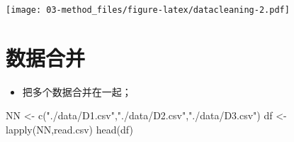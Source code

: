\documentclass[
]{book}
\newenvironment{Shaded}{\begin{snugshade}}{\end{snugshade}}
\newcommand{\FunctionTok}[1]{\textcolor[rgb]{0.00,0.00,0.00}{#1}}
\newcommand{\NormalTok}[1]{#1}
\newcommand{\OtherTok}[1]{\textcolor[rgb]{0.56,0.35,0.01}{#1}}
\newcommand{\StringTok}[1]{\textcolor[rgb]{0.31,0.60,0.02}{#1}}
\providecommand{\tightlist}{%
  \setlength{\itemsep}{0pt}\setlength{\parskip}{0pt}}
\begin{document}
\texttt{[image: 03-method\_files/figure-latex/datacleaning-2.pdf]}

\hypertarget{ux6570ux636eux5408ux5e76}{%
\section{数据合并}\label{ux6570ux636eux5408ux5e76}}

\begin{itemize}
\tightlist
\item
  把多个数据合并在一起；
\end{itemize}

\begin{Shaded}
\begin{Highlighting}[]
\NormalTok{NN }\OtherTok{\textless{}{-}}  \FunctionTok{c}\NormalTok{(}\StringTok{"./data/D1.csv"}\NormalTok{,}\StringTok{"./data/D2.csv"}\NormalTok{,}\StringTok{"./data/D3.csv"}\NormalTok{)}
\NormalTok{df }\OtherTok{\textless{}{-}} \FunctionTok{lapply}\NormalTok{(NN,read.csv)}
\FunctionTok{head}\NormalTok{(df)}
\end{Highlighting}
\end{Shaded}
\end{document}
